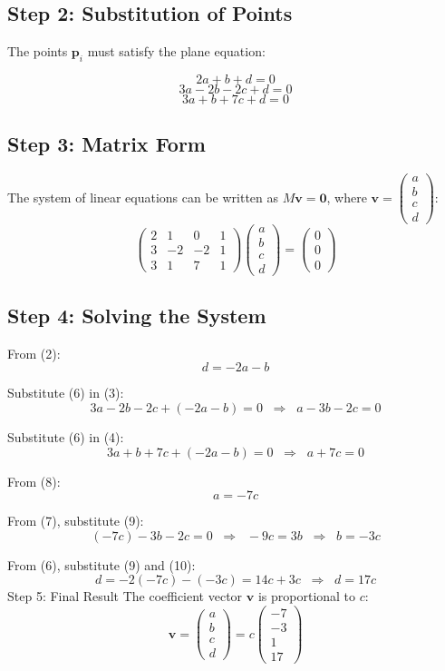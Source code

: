 \documentclass[journal]{IEEEtran}
\begin{document}
\subsection*{Step 2: Substitution of Points}
The points $\mathbf{p}_i$ must satisfy the plane equation:

\[
2a + b + d = 0 \tag{2}
\]
\[
3a - 2b - 2c + d = 0 \tag{3}
\]
\[
3a + b + 7c + d = 0 \tag{4}
\]
\subsection*{Step 3: Matrix Form}
The system of linear equations can be written as $M \mathbf{v} = \mathbf{0}$, where $\mathbf{v} = \begin{pmatrix} a\\ b\\ c\\ d \end{pmatrix}$:
\[
\begin{pmatrix}
2 & 1 & 0 & 1\\
3 & -2 & -2 & 1\\
3 & 1 & 7 & 1
\end{pmatrix}
\begin{pmatrix} a\\ b\\ c\\ d \end{pmatrix}
=
\begin{pmatrix} 0\\0\\0 \end{pmatrix}
\tag{5}
\]
\subsection*{Step 4: Solving the System}
From (2):
\[
d = -2a - b \tag{6}
\]

Substitute (6) in (3):
\[
3a - 2b - 2c + (-2a - b) = 0 \;\;\Rightarrow\;\; a - 3b - 2c = 0 \tag{7}
\]

Substitute (6) in (4):
\[
3a + b + 7c + (-2a - b) = 0 \;\;\Rightarrow\;\; a + 7c = 0 \tag{8}
\]

From (8):
\[
a = -7c \tag{9}
\]

From (7), substitute (9):
\[
(-7c) - 3b - 2c = 0 \;\;\Rightarrow\;\; -9c = 3b \;\;\Rightarrow\;\; b = -3c \tag{10}
\]

From (6), substitute (9) and (10):
\[
d = -2(-7c) - (-3c) = 14c + 3c \;\;\Rightarrow\;\; d = 17c \tag{11}
\]
{Step 5: Final Result}
The coefficient vector $\mathbf{v}$ is proportional to $c$:
\[
\mathbf{v} = \begin{pmatrix} a\\ b\\ c\\ d \end{pmatrix} = c \begin{pmatrix} -7\\ -3\\ 1\\ 17 \end{pmatrix}
\]
\end{document}
